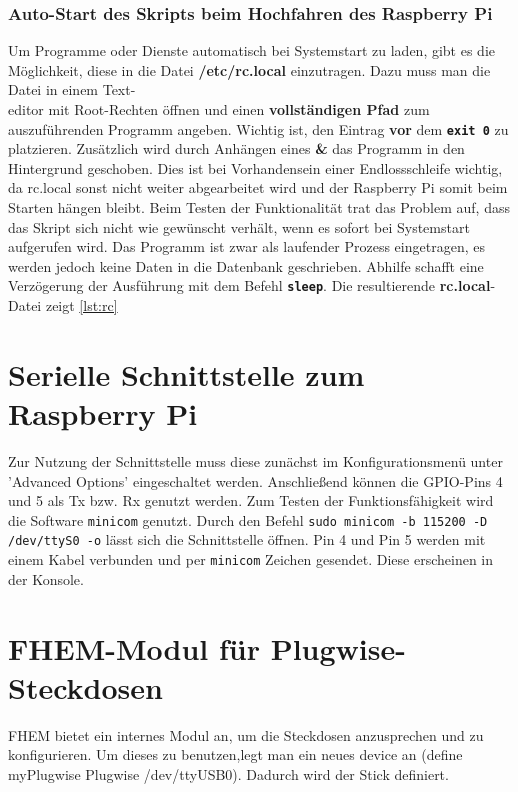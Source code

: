 \appendix

\subsubsection*{Auto-Start des Skripts beim Hochfahren des Raspberry Pi}
Um Programme oder Dienste automatisch bei Systemstart zu laden, gibt es die Möglichkeit, diese in die Datei \textbf{/etc/rc.local} einzutragen. Dazu muss man die Datei in einem Text-\\editor mit Root-Rechten öffnen und einen \textbf{vollständigen Pfad} zum auszuführenden Programm angeben. Wichtig ist, den Eintrag \textbf{vor} dem \textbf{\texttt{exit 0}} zu platzieren. \newline 
Zusätzlich wird durch Anhängen eines \textbf{\&} das Programm in den Hintergrund geschoben. Dies ist bei Vorhandensein einer Endlossschleife wichtig, da rc.local sonst nicht weiter abgearbeitet wird und der Raspberry Pi somit beim Starten hängen bleibt. \newline
Beim Testen der Funktionalität trat das Problem auf, dass das Skript sich nicht wie gewünscht verhält, wenn es sofort bei Systemstart aufgerufen wird. Das Programm ist zwar als laufender Prozess eingetragen, es werden jedoch keine Daten in die Datenbank geschrieben. Abhilfe schafft eine Verzögerung der Ausführung mit dem Befehl \textbf{\texttt{sleep}}.\newline
Die resultierende \textbf{rc.local}-Datei zeigt \autoref{lst:rc}




\section{Serielle Schnittstelle zum Raspberry Pi}

Zur Nutzung der Schnittstelle muss diese zunächst im Konfigurationsmenü unter 'Advanced Options' eingeschaltet werden. Anschließend können die GPIO-Pins 4 und 5 als Tx bzw. Rx genutzt werden. Zum Testen der Funktionsfähigkeit wird die Software \texttt{minicom} genutzt. Durch den Befehl \texttt{sudo minicom -b 115200 -D /dev/ttyS0 -o} lässt sich die Schnittstelle öffnen. Pin 4 und Pin 5 werden mit einem Kabel verbunden und per \texttt{minicom} Zeichen gesendet. Diese erscheinen in der Konsole.



\section{FHEM-Modul für Plugwise-Steckdosen}
FHEM bietet ein internes Modul an, um die Steckdosen anzusprechen und zu konfigurieren. Um dieses zu benutzen,legt man ein neues device an (define myPlugwise Plugwise /dev/ttyUSB0). Dadurch wird der Stick definiert.


